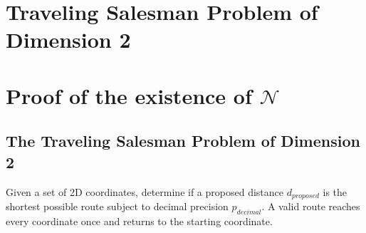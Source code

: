 \documentclass[11pt]{article}
\begin{document}
\section*{Traveling Salesman Problem of Dimension 2}
\section{Proof of the existence of $\mathcal{N}$}

\subsection{The Traveling Salesman Problem of Dimension 2}
Given a set of 2D coordinates, determine if a proposed distance $d_{proposed}$ is the shortest possible route subject to decimal precision $p_{decimal}$. A valid route reaches every coordinate once and returns to the starting coordinate.
\end{document}
